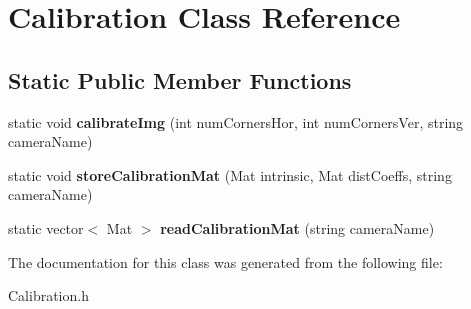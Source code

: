 \hypertarget{classCalibration}{}\section{Calibration Class Reference}
\label{classCalibration}
\subsection*{Static Public Member Functions}
\begin{DoxyCompactItemize}
\item 
\mbox{\label{classCalibration_a8e682a5065279297279b6b8ca4c095b6}} 
static void {\bfseries calibrate\+Img} (int num\+Corners\+Hor, int num\+Corners\+Ver, string camera\+Name)
\item 
\mbox{\label{classCalibration_af14df4879d8b1c76ff2faa6ede59fc94}} 
static void {\bfseries store\+Calibration\+Mat} (Mat intrinsic, Mat dist\+Coeffs, string camera\+Name)
\item 
\mbox{\label{classCalibration_a1700229db91e644ab02ace6e27c84a6a}} 
static vector$<$ Mat $>$ {\bfseries read\+Calibration\+Mat} (string camera\+Name)
\end{DoxyCompactItemize}


The documentation for this class was generated from the following file\+:\begin{DoxyCompactItemize}
\item 
Calibration.\+h\end{DoxyCompactItemize}
